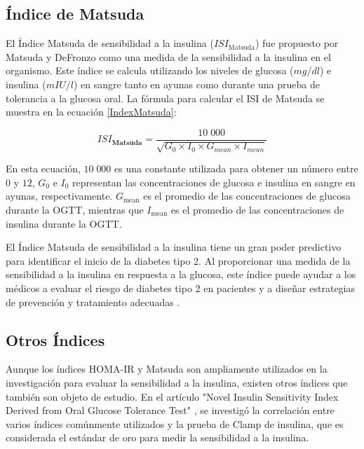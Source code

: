 \subsection{Índice de Matsuda}

El Índice Matsuda de sensibilidad a la insulina ($ISI_{\text{Matsuda}}$) fue propuesto por Matsuda y DeFronzo como una medida de la sensibilidad a la insulina en el organismo. Este índice se calcula utilizando los niveles de glucosa ($mg/dl$) e insulina ($mIU/l$) en sangre tanto en ayunas como durante una prueba de tolerancia a la glucosa oral. La fórmula para calcular el ISI de Matsuda se muestra en la ecuación \eqref{IndexMatsuda}:

\begin{equation}\label{IndexMatsuda}
    ISI_{\textbf{Matsuda}} = \frac{10\;000}{\sqrt{G_0 \times I_0 \times G_{mean} \times I_{mean}}}
\end{equation}

En esta ecuación, $10 \; 000$ es una constante utilizada para obtener un número entre $0$ y $12$, $G_0$ e $I_0$ representan las concentraciones de glucosa e insulina en sangre en ayunas, respectivamente. $G_{\text{mean}}$ es el promedio de las concentraciones de glucosa durante la OGTT, mientras que $I_{\text{mean}}$ es el promedio de las concentraciones de insulina durante la OGTT.

El Índice Matsuda de sensibilidad a la insulina tiene un gran poder predictivo para identificar el inicio de la diabetes tipo 2. Al proporcionar una medida de la sensibilidad a la insulina en respuesta a la glucosa, este índice puede ayudar a los médicos a evaluar el riesgo de diabetes tipo 2 en pacientes y a diseñar estrategias de prevención y tratamiento adecuadas \cite{indicesRes}.

\subsection{Otros Índices}

Aunque los índices HOMA-IR y Matsuda son ampliamente utilizados en la investigación para evaluar la sensibilidad a la insulina, existen otros índices que también son objeto de estudio. En el artículo "Novel Insulin Sensitivity Index Derived from Oral Glucose Tolerance Test" \cite{NovelInsulin}, se investigó la correlación entre varios índices comúnmente utilizados y la prueba de Clamp de insulina, que es considerada el estándar de oro para medir la sensibilidad a la insulina.

